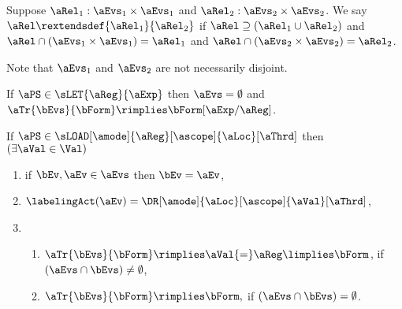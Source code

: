\begin{definition}
  Suppose $\aRel_1:\aEvs_1\times\aEvs_1$ and $\aRel_2:\aEvs_2\times\aEvs_2$.
  We say $\aRel \rextendsdef{\aRel_1}{\aRel_2}$ if
  $\aRel\supseteq (\aRel_1\cup \aRel_2)$ and
  $\aRel\cap(\aEvs_1\times \aEvs_1) = \aRel_1$ and
  $\aRel\cap(\aEvs_2\times \aEvs_2) = \aRel_2$.
\end{definition}
Note that $\aEvs_1$ and $\aEvs_2$ are not necessarily disjoint.

\begin{definition}
  \noindent
  If $\aPS\in\sLET{\aReg}{\aExp}$ then $\aEvs = \emptyset$ and
  $\aTr{\bEvs}{\bForm} \rimplies \bForm[\aExp/\aReg]$.

  \noindent
  If $\aPS \in \sLOAD[\amode]{\aReg}[\ascope]{\aLoc}[\aThrd]$ then
  $(\exists\aVal\in\Val)$
  \begin{multicols}{2}
    \begin{enumerate}[topsep=0pt,label=(\textsc{r}\arabic*),ref=\textsc{r}\arabic*]
    \item \label{read-E}
      if $\bEv,\aEv\in\aEvs$ then $\bEv=\aEv$,
    \item \label{read-lambda}
      $\labelingAct(\aEv) = \DR[\amode]{\aLoc}[\ascope]{\aVal}[\aThrd]$,
    \item[] 
      \begin{enumerate}[leftmargin=0pt]
      \item \label{read-tau-nonempty}
        \begin{math}
          \aTr{\bEvs}{\bForm} \rimplies
          \aVal{=}\aReg
          \limplies \bForm
        \end{math},    
        if $(\aEvs\cap\bEvs)\neq\emptyset$,
      \item \label{read-tau-empty}
        \begin{math}
          \aTr{\bEvs}{\bForm} \rimplies
          \bForm,
        \end{math}
        if $(\aEvs\cap\bEvs)=\emptyset$.
      \end{enumerate}
    \end{enumerate}
  \end{multicols}
  \medskip


\end{definition}
